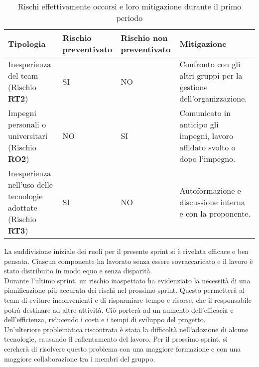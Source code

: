 \begin{table}[!h]
    \centering
    \begin{tabular}{|p{5cm}| p{2.5cm}| p{2.5cm}| p{6cm}|} 
        \hline
        \textbf{Tipologia} & \textbf{Rischio preventivato} & \textbf{Rischio non preventivato} & \textbf{Mitigazione}  \\
        \hline  
        Inesperienza del team (Rischio \textbf{RT2}) & SI & NO & Confronto con gli altri gruppi per la gestione dell'organizzazione.\\
        \hline %
        Impegni personali o universitari (Rischio \textbf{RO2})& NO & SI & Comunicato in anticipo gli impegni, lavoro affidato svolto o dopo l'impegno.\\
        \hline
        Inesperienza nell'uso delle tecnologie adottate (Rischio \textbf{RT3}) & SI & NO & Autoformazione e discussione interna e con la proponente.\\
        \hline
    \end{tabular}
    \caption{Rischi effettivamente occorsi e loro mitigazione durante il primo periodo}
    \label{tab:4}
\end{table}
La suddivisione iniziale dei ruoli per il presente sprint si è rivelata efficace e ben pensata. Ciascun componente ha lavorato senza essere sovraccaricato e il lavoro è stato distribuito in modo equo e senza disparità.\\
Durante l’ultimo sprint, un rischio inaspettato ha evidenziato la necessità di una pianificazione più accurata dei rischi nel prossimo sprint. Questo permetterà al team di evitare inconvenienti e di risparmiare tempo e risorse, che il responsabile potrà destinare ad altre attività. Ciò porterà ad un aumento dell’efficacia e dell’efficienza, riducendo i costi e i tempi di sviluppo del progetto.\\
Un'ulteriore problematica riscontrata è stata la difficoltà nell'adozione di alcune tecnologie, causando il rallentamento del lavoro. Per il prossimo sprint, si cercherà di risolvere questo problema con una maggiore formazione e con una maggiore collaborazione tra i membri del gruppo.\\
